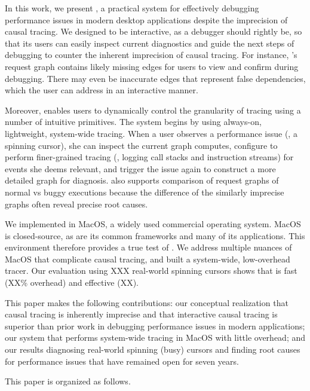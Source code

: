 In this work, we present \xxx, a practical system for effectively debugging
performance issues in modern desktop applications despite the imprecision of
causal tracing.  We designed \xxx to be interactive, as a debugger should rightly be,
so that its users can easily inspect current diagnostics and guide the next
steps of debugging to counter the inherent imprecision of causal tracing. For
instance, \xxx's request graph contains likely missing edges
for users to view and confirm during debugging. There may even be inaccurate
edges that represent false dependencies, which the user can address in an
interactive manner.

Moreover, \xxx enables users to dynamically control the granularity of
tracing using a number of intuitive primitives. The system begins by using
always-on, lightweight, system-wide tracing.  When a user observes a
performance issue (\eg, a spinning cursor), she can inspect the current
graph \xxx computes, configure \xxx to perform finer-grained tracing (\eg,
logging call stacks and instruction streams) for events she deems
relevant, and trigger the issue again to construct a more detailed graph for diagnosis.  \xxx also
supports comparison of request graphs of normal vs buggy executions
because the difference of the similarly imprecise graphs often reveal
precise root causes.  %

We implemented \xxx in MacOS, a widely used commercial operating system. MacOS
is closed-source, as are its common frameworks and many of its applications.
This environment therefore provides a true test of \xxx.  We address multiple
nuances of MacOS that complicate causal tracing, and built a system-wide,
low-overhead tracer.  Our evaluation using XXX real-world spinning cursors
shows that \xxx is fast (XX\% overhead) and effective (XX).

This paper makes the following contributions: our conceptual realization
that causal tracing is inherently imprecise and that interactive causal
tracing is superior than prior work in debugging performance issues in
modern applications; our system \xxx that performs system-wide tracing in
MacOS with little overhead; and our results diagnosing real-world spinning (busy)
cursors and finding root causes for performance issues that have remained open
for seven years.

This paper is organized as follows.


